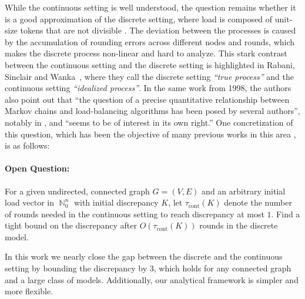 \documentclass[twoside,leqno]{article}
\DeclareMathOperator{\N}{\mathbb{N}}
\DeclareMathOperator{\1}{\mathbf{1}}
\numberwithin{equation}{section}
\begin{document}
While the continuous setting is well understood, the question remains whether it is a good approximation of the discrete setting, where load is composed of unit-size tokens that are not divisible \cite{DBLP:conf/focs/RabaniSW98}. The deviation between the processes is caused by the accumulation of rounding errors across different nodes and rounds, which makes the discrete process non-linear and hard to analyze.
This stark contrast between the continuous setting and the discrete setting is highlighted in Rabani, Sinclair and Wanka~\cite{DBLP:conf/focs/RabaniSW98}, where they call the discrete setting \emph{``true process''} and the continuous setting \emph{``idealized process''}. In the same work from 1998, the authors also point out that ``the question of a precise quantitative relationship between Markov chains and load-balancing algorithms has been posed by several authors'', notably in \cite{DBLP:journals/jcss/GhoshM96,lovasz1995mixing,DBLP:journals/mst/MuthukrishnanGS98,DBLP:journals/jcss/GhoshM96,DBLP:conf/spaa/SubramanianS94}, and ``seems to be of interest in its own right.'' One concretization of this question, which has been the objective of many previous works in this area \cite{DBLP:conf/focs/RabaniSW98,DBLP:conf/focs/SauerwaldS12,DBLP:conf/stoc/FriedrichS09,DBLP:journals/jcss/BerenbrinkCFFS15}, is as follows:




\paragraph{Open Question:} For a given undirected, connected graph $G=(V,E)$ and an arbitrary initial load vector in $\N_0^n$ with initial discrepancy $K$, let $\tau_{\text{cont}}(K)$ denote the number of rounds needed in the continuous setting to reach discrepancy at most $1$. Find a tight bound on the discrepancy after $O(\tau_{\text{cont}}(K))$ rounds in the discrete model. 

\medskip
In this work we nearly close the gap between the discrete and the continuous setting by bounding the discrepancy by $3$, which holds for any connected graph and a large class of models.
Additionally, our analytical framework is simpler and more flexible.
\end{document}
